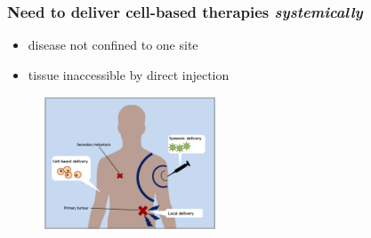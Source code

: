 \documentclass[8pt,xcolor=table]{beamer}
\begin{document}
% 
% 
%  
% 
% 
% 


\begin{frame}
\frametitle{Need to deliver cell-based therapies  \emph{systemically}}
 
\begin{itemize}
 \item disease not confined to one site
 \item tissue inaccessible by direct injection
\end{itemize}
 
 
\begin{figure}
\centering
\includegraphics[height=4cm]{systemic}
\end{figure}

 
\end{frame}
\end{document}
